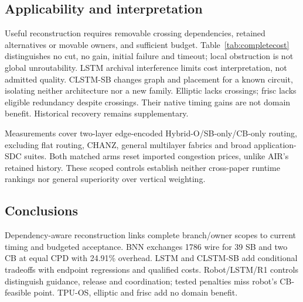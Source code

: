 \documentclass[conference,10pt]{IEEEtran}
\begin{document}
\subsection{Applicability and interpretation}
Useful reconstruction requires removable crossing dependencies, retained alternatives or movable owners, and sufficient budget. Table~\ref{tab:completecost} distinguishes no cut, no gain, initial failure and timeout; local obstruction is not global unroutability. LSTM archival interference limits cost interpretation, not admitted quality. CLSTM-SB changes graph and placement for a known circuit, isolating neither architecture nor a new family. Elliptic lacks crossings; frisc lacks eligible redundancy despite crossings. Their native timing gains are not domain benefit. Historical recovery remains supplementary.

Measurements cover two-layer edge-encoded Hybrid-O/SB-only/CB-only routing, excluding flat routing, CHANZ, general multilayer fabrics and broad application-SDC suites. Both matched arms reset imported congestion prices, unlike AIR's retained history. These scoped controls establish neither cross-paper runtime rankings nor general superiority over vertical weighting.

\subsection{Conclusions}
Dependency-aware reconstruction links complete branch/owner scopes to current timing and budgeted acceptance. BNN exchanges 1786 wire for 39 SB and two CB at equal CPD with 24.91\% overhead. LSTM and CLSTM-SB add conditional tradeoffs with endpoint regressions and qualified costs. Robot/LSTM/R1 controls distinguish guidance, release and coordination; tested penalties miss robot's CB-feasible point. TPU-OS, elliptic and frisc add no domain benefit.


\end{document}
